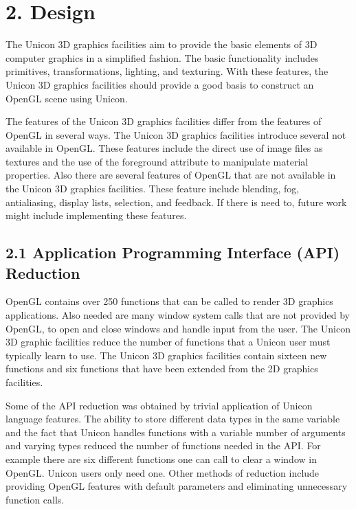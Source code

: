 \documentclass[letterpaper]{article}
\begin{document}
\section[2. Design]{2. Design}

{
The Unicon 3D graphics facilities aim to provide the basic elements of 3D computer graphics in a simplified fashion. The
basic functionality includes primitives, transformations, lighting, and texturing. With these features, the Unicon 3D
graphics facilities should provide a good basis to construct an OpenGL scene using Unicon.}

{
The features of the Unicon 3D graphics facilities differ from the features of OpenGL in several ways. The Unicon 3D
graphics facilities introduce several not available in OpenGL. These features include the direct use of image files as
textures and the use of the foreground attribute to manipulate material properties. Also there are several features of
OpenGL that are not available in the Unicon 3D graphics facilities. These feature include blending, fog, antialiasing,
display lists, selection, and feedback. If there is need to, future work might include implementing these features. }

\subsection[2.1 Application Programming Interface (API)
Reduction]{\bfseries 2.1 Application Programming Interface (API) Reduction}

{
OpenGL contains over 250 functions that can be called to render 3D graphics applications. Also needed are many window
system calls that are not provided by OpenGL, to open and close windows and handle input from the user. The Unicon 3D
graphic facilities reduce the number of functions that a Unicon user must typically learn to use. The Unicon 3D
graphics facilities contain sixteen new functions and six functions that have been extended from the 2D graphics
facilities. }

{
Some of the API reduction was obtained by trivial application of Unicon language features. The ability to store
different data types in the same variable and the fact that Unicon handles functions with a variable number of
arguments and varying types reduced the number of functions needed in the API. For example there are six different
functions one can call to clear a window in OpenGL. Unicon users only need one. Other methods of reduction include
providing OpenGL features with default parameters and eliminating unnecessary function calls.}
\end{document}
